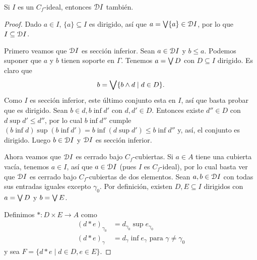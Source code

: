 \begin{lemma}
  Si $I$ es un $C_f$-ideal, entonces $\mathcal D I$ también.
\end{lemma}
\begin{proof}
  Dado $a\in I$, $\{a\}\subseteq I$ es dirigido, así que
  $a=\bigvee\{a\}\in \mathcal D I$, por lo que $I\subseteq\mathcal D I$.

  Primero veamos que $\mathcal D I$ es sección inferior.
  Sean $a\in \mathcal D I$ y $b\leq a$.
  Podemos suponer que $a$ y $b$ tienen soporte en $\Gamma$.
  Tenemos $a=\bigvee D$ con $D\subseteq I$ dirigido.
  Es claro que
  \[
    b = \bigvee\{b\wedge d\mid d\in D\}
  .\]
  Como $I$ es sección inferior, este último conjunto esta en $I$,
  así que basta probar que es dirigido.
  Sean $b\in d,b\inf d'$ con $d,d'\in D$.
  Entonces existe $d''\in D$ con $d\sup d'\leq d''$, por lo
  cual $b\inf d''$ cumple
  $(b\inf d)\sup(b\inf d')=b\inf(d\sup d')\leq b\inf d''$ y, así,
  el conjunto es dirigido.
  Luego $b\in\mathcal D I$ y $\mathcal D I$ es sección inferior.

  Ahora veamos que $\mathcal D I$ es cerrado bajo $C_f$-cubiertas.
  Si $a\in A$ tiene una cubierta vacía, tenemos $a\in I$, así que
  $a\in\mathcal D I$ (pues $I$ es $C_f$-ideal),
  por lo cual basta ver que $\mathcal D I$ es cerrado
  bajo $C_f$-cubiertas de dos elementos.
  Sean $a,b\in\mathcal D I$ con todas sus entradas iguales excepto
  $\gamma_0$.
  Por definición, existen $D,E\subseteq I$ dirigidos con
  $a=\bigvee D$ y $b=\bigvee E$.

  Definimos $*:D\times E\to A$ como
  \begin{align*}
    (d*e)_{\gamma_0} &= d_{\gamma_0} \sup e_{\gamma_0} \\
    (d*e)_{\gamma} &= d_{\gamma} \inf e_{\gamma} \text{ para }
    \gamma\neq\gamma_0
  \end{align*}
  y sea $F=\{d*e \mid d\in D, e\in E\}$.


\end{proof}
